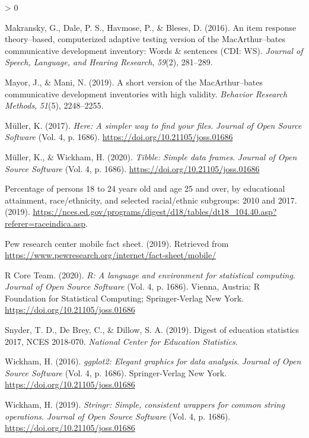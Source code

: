 \documentclass[
  english,
  ,man,floatsintext]{apa6}
\newlength{\cslhangindent}
\newenvironment{CSLReferences}[2] %
 {%
  \setlength{\parindent}{0pt}
  \ifodd #1 \everypar{\setlength{\hangindent}{\cslhangindent}}\ignorespaces\fi
  \ifnum #2 > 0
  \setlength{\parskip}{#2\baselineskip}
  \fi
 }%
 {}
\begin{document}
\begin{CSLReferences}{1}{0}
\leavevmode\hypertarget{ref-makransky2016}{}%
Makransky, G., Dale, P. S., Havmose, P., \& Bleses, D. (2016). An item response theory--based, computerized adaptive testing version of the MacArthur--bates communicative development inventory: Words \& sentences (CDI: WS). \emph{Journal of Speech, Language, and Hearing Research}, \emph{59}(2), 281--289.

\leavevmode\hypertarget{ref-Mayor2019}{}%
Mayor, J., \& Mani, N. (2019). A short version of the MacArthur--bates communicative development inventories with high validity. \emph{Behavior Research Methods}, \emph{51}(5), 2248--2255.

\leavevmode\hypertarget{ref-R-here}{}%
Müller, K. (2017). \emph{Here: A simpler way to find your files}. \emph{Journal of Open Source Software} (Vol. 4, p. 1686). \url{https://doi.org/10.21105/joss.01686}

\leavevmode\hypertarget{ref-R-tibble}{}%
Müller, K., \& Wickham, H. (2020). \emph{Tibble: Simple data frames}. \emph{Journal of Open Source Software} (Vol. 4, p. 1686). \url{https://doi.org/10.21105/joss.01686}

\leavevmode\hypertarget{ref-nces2019}{}%
Percentage of persons 18 to 24 years old and age 25 and over, by educational attainment, race/ethnicity, and selected racial/ethnic subgroups: 2010 and 2017. (2019). \url{https://nces.ed.gov/programs/digest/d18/tables/dt18_104.40.asp?referer=raceindica.asp}.

\leavevmode\hypertarget{ref-Center2019}{}%
Pew research center mobile fact sheet. (2019). Retrieved from \url{https://www.pewresearch.org/internet/fact-sheet/mobile/}

\leavevmode\hypertarget{ref-R-base}{}%
R Core Team. (2020). \emph{R: A language and environment for statistical computing}. \emph{Journal of Open Source Software} (Vol. 4, p. 1686). Vienna, Austria: R Foundation for Statistical Computing; Springer-Verlag New York. \url{https://doi.org/10.21105/joss.01686}

\leavevmode\hypertarget{ref-Snyder2019}{}%
Snyder, T. D., De Brey, C., \& Dillow, S. A. (2019). Digest of education statistics 2017, NCES 2018-070. \emph{National Center for Education Statistics}.

\leavevmode\hypertarget{ref-R-ggplot2}{}%
Wickham, H. (2016). \emph{ggplot2: Elegant graphics for data analysis}. \emph{Journal of Open Source Software} (Vol. 4, p. 1686). Springer-Verlag New York. \url{https://doi.org/10.21105/joss.01686}

\leavevmode\hypertarget{ref-R-stringr}{}%
Wickham, H. (2019). \emph{Stringr: Simple, consistent wrappers for common string operations}. \emph{Journal of Open Source Software} (Vol. 4, p. 1686). \url{https://doi.org/10.21105/joss.01686}


\end{CSLReferences}
\end{document}
